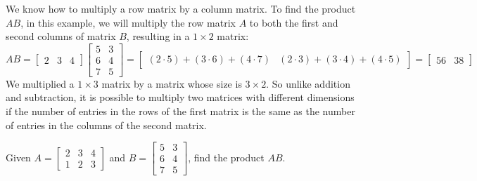 \begin{solution}
    We know how to multiply a row matrix by a column matrix. To find the product $AB$, in this example, we will multiply the row matrix $A$ to both the first and second columns of matrix $B$, resulting in a $1 \times 2$ matrix:
    \[
        AB = \begin{bmatrix} 2 & 3 & 4 \end{bmatrix} \begin{bmatrix} 5 & 3 \\ 6 & 4 \\ 7 & 5 \end{bmatrix} = \begin{bmatrix} (2 \cdot 5) + (3 \cdot 6) + (4 \cdot 7) & (2 \cdot 3) + (3 \cdot 4) + (4 \cdot 5) \end{bmatrix} = \begin{bmatrix} 56 & 38 \end{bmatrix}
    \]
    We multiplied a $1 \times 3$ matrix by a matrix whose size is $3 \times 2$. So unlike addition and subtraction, it is possible to multiply two matrices with different dimensions if the number of entries in the rows of the first matrix is the same as the number of entries in the columns of the second matrix.
\end{solution}

\begin{example}
    Given $A = \begin{bmatrix} 2 & 3 & 4 \\ 1 & 2 & 3 \end{bmatrix}$ and $B = \begin{bmatrix} 5 & 3 \\ 6 & 4 \\ 7 & 5 \end{bmatrix}$, find the product $AB$.
\end{example}

